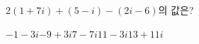 $2(1+7i)+(5-i)-(2i-6)$의 값은?
\begin{choices32}{$-1-3i$}{$-9+3i$}{$7-7i$}{$11-3i$}{$13+11i$}\end{choices32}
